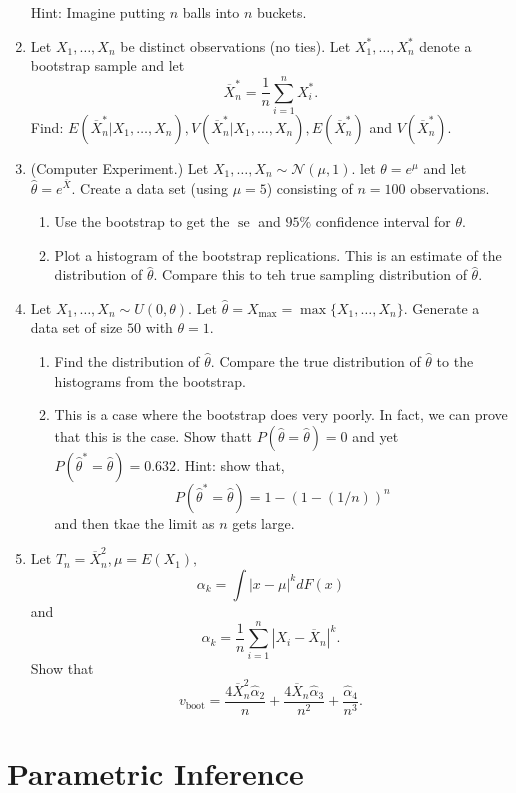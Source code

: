 \documentclass{article}
\newcommand{\se}{\operatorname{se}}
\begin{document}
\begin{enumerate}
	Hint: Imagine putting $n$ balls into $n$ buckets.
	\item Let $X_1, \dots, X_n$ be distinct observations (no ties). Let $X_1^*, \dots, X_n^*$ denote a bootstrap sample and let
	$$
	\overline{X}_n^* = \frac{1}{n} \sum_{i = 1}^n X_i^*.
	$$
	Find: $E(\overline{X}_n^* | X_1, \dots, X_n), V(\overline{X}_n^*|X_1, \dots, X_n), E(\overline{X}_n^*)$ and $V(\overline{X}_n^*)$.
	\item (Computer Experiment.) Let $X_1, \dots, X_n \sim \mathcal{N}(\mu, 1)$. let $\theta = e^\mu$ and let $\hat{\theta} = e^{\overline{X}}$. Create a data set (using $\mu = 5$) consisting of $n = 100$ observations.
		\begin{enumerate}
			\item Use the bootstrap to get the $\se$ and $95\%$ confidence interval for $\theta$.
			\item Plot a histogram of the bootstrap replications. This is an estimate of the distribution of $\hat{\theta}$. Compare this to teh true sampling distribution of $\hat{\theta}$.
		\end{enumerate}
	\item Let $X_1, \dots, X_n \sim U(0, \theta)$. Let $\hat{\theta} = X_{\max} = \max\{X_1, \dots, X_n\}$. Generate a data set of size $50$ with $\theta = 1$.
		\begin{enumerate}
			\item Find the distribution of $\hat{\theta}$. Compare the true distribution of $\hat{\theta}$ to the histograms from the bootstrap.
			\item This is a case where the bootstrap does very poorly. In fact, we can prove that this is the case. Show thatt $P(\hat{\theta} = \hat{\theta}) = 0$ and yet $P(\hat{\theta}^* = \hat{\theta}) = 0.632.$ Hint: show that,
			$$
			P(\hat{\theta}^* = \hat{\theta}) = 1 - (1 - (1 / n))^n
			$$
			and then tkae the limit as $n$ gets large.
		\end{enumerate}
	\item Let $T_n = \overline{X}_n^2, \mu = E(X_1),$
	$$
	\alpha_k = \int |x - \mu|^k dF(x)
	$$
	and
	$$
	\hat{\alpha}_k = \frac{1}{n} \sum_{i = 1}^n |X_i - \overline{X}_n|^k.
	$$
	Show that
	$$
	v_{\operatorname{boot}} = \frac{4 \overline{X}_n^2 \hat{\alpha}_2}{n} + \frac{4 \overline{X}_n \hat{\alpha}_3}{n^2} + \frac{\hat{\alpha}_4}{n^3}.
	$$
\end{enumerate}

\section{Parametric Inference}
\end{document}
